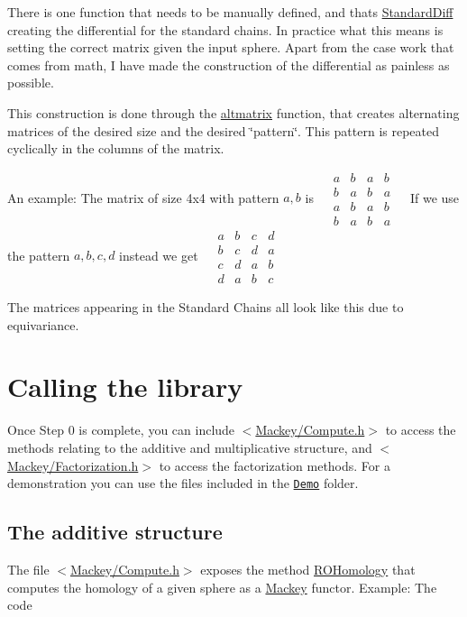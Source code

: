 \begin{DoxyItemize}
\item There is one function that needs to be manually defined, and that\textquotesingle{}s \hyperlink{classGroupSpecific_1_1Function_a8ead55e2f2e2bbda4deea3964793498d}{Standard\+Diff} creating the differential for the standard chains. In practice what this means is setting the correct matrix given the input sphere. Apart from the case work that comes from math, I have made the construction of the differential as painless as possible.
\item This construction is done through the \hyperlink{namespaceMackey_a26a529f63caac9c5b4dc809e0e5831be}{altmatrix} function, that creates alternating matrices of the desired size and the desired \char`\"{}pattern\char`\"{}. This pattern is repeated cyclically in the columns of the matrix.
\item An example\+: The matrix of size 4x4 with pattern $a,b$ is ~\newline
 $\begin{matrix} a&b&a&b\\ b&a&b&a\\ a&b&a&b \\ b&a&b&a \end{matrix}$ ~\newline
 If we use the pattern $a,b,c,d$ instead we get ~\newline
 $\begin{matrix} a&b&c&d\\ b&c&d&a\\ c&d&a&b \\ d&a&b&c \end{matrix}$ ~\newline

\item The matrices appearing in the Standard Chains all look like this due to equivariance.
\end{DoxyItemize}\hypertarget{use_next}{}\section{Calling the library}\label{use_next}
Once Step 0 is complete, you can include {\ttfamily $<$\hyperlink{Compute_8h}{Mackey/\+Compute.\+h}$>$} to access the methods relating to the additive and multiplicative structure, and {\ttfamily $<$\hyperlink{Factorization_8h}{Mackey/\+Factorization.\+h}$>$} to access the factorization methods. For a demonstration you can use the files included in the \href{https://github.com/NickG-Math/Mackey/Demo}{\tt Demo} folder.\hypertarget{use_step1add}{}\subsection{The additive structure}\label{use_step1add}
The file {\ttfamily $<$\hyperlink{Compute_8h}{Mackey/\+Compute.\+h}$>$} exposes the method \hyperlink{namespaceMackey_a58708ee937b0c4172b7cde8e5f856504}{R\+O\+Homology} that computes the homology of a given sphere as a \hyperlink{namespaceMackey}{Mackey} functor. Example\+: The code

